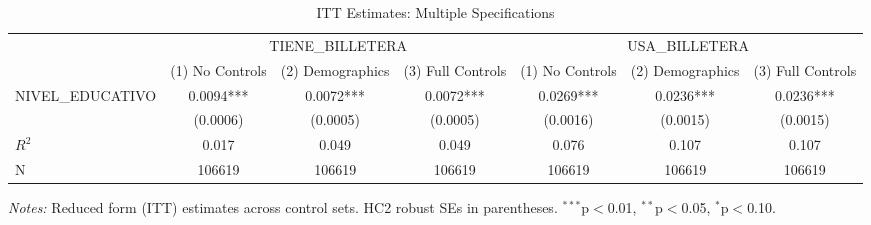 \begin{table}[htbp]
\centering
\caption{ITT Estimates: Multiple Specifications}
\label{tab:itt_multi}
\begin{tabular}{l cccccc}
\toprule
 & \multicolumn{3}{c}{TIENE_BILLETERA} & \multicolumn{3}{c}{USA_BILLETERA} \\
 & (1) No Controls & (2) Demographics & (3) Full Controls & (1) No Controls & (2) Demographics & (3) Full Controls \\
\midrule
  NIVEL_EDUCATIVO & 0.0094*** & 0.0072*** & 0.0072*** & 0.0269*** & 0.0236*** & 0.0236*** \\
   & (0.0006) & (0.0005) & (0.0005) & (0.0016) & (0.0015) & (0.0015) \\
\addlinespace
  $R^2$ & 0.017 & 0.049 & 0.049 & 0.076 & 0.107 & 0.107 \\
  N & 106619 & 106619 & 106619 & 106619 & 106619 & 106619 \\
\bottomrule
\end{tabular}
\begin{tablenotes}
\small
\item \textit{Notes:} Reduced form (ITT) estimates across control sets. HC2 robust SEs in parentheses. $^{***}$p$<$0.01, $^{**}$p$<$0.05, $^{*}$p$<$0.10.
\end{tablenotes}
\end{table}